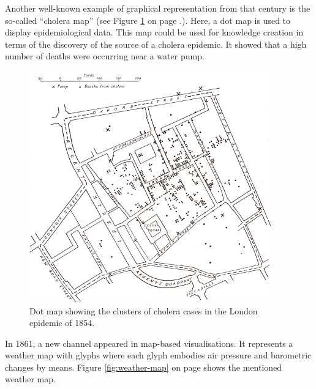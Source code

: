Another well-known example of graphical representation from that century is the so-called ``cholera map'' (see Figure \ref{fig:cholera-map} on page \pageref{fig:cholera-map}.). Here, a dot map is used to display epidemiological data. This map could be used for knowledge creation in terms of the discovery of the source of a cholera epidemic. It showed that a high number of deaths were occurring near a water pump.

\begin{figure}[!htb]
\centering
\includegraphics[height=10cm,keepaspectratio]{images/history/cholera2.png}
\caption[
    Dot map showing the clusters of cholera cases in the London epidemic of 1854., Urldate: 07.2016 \newline
\small\texttt{\url{http://datavis.ca/milestones//admin/uploads/images/tufte/snow.gif}}
]{Dot map showing the clusters of cholera cases in the London epidemic of 1854.}
\label{fig:cholera-map}
\end{figure}

In 1861, a new channel appeared in map-based visualisations. It represents a weather map with glyphs where each glyph embodies air pressure and barometric changes by means. Figure \ref{fig:weather-map} on page \pageref{fig:weather-map} shows the mentioned weather map.

